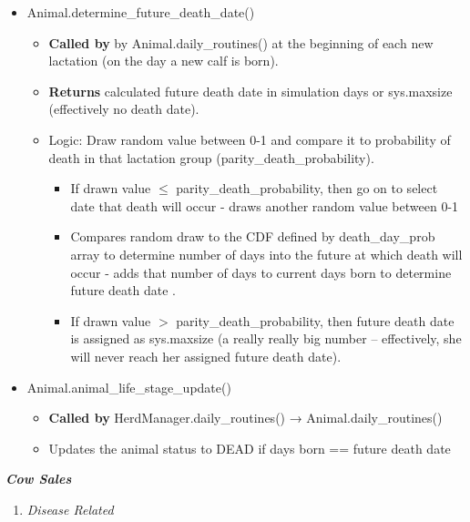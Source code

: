\begin{refsection}
        \begin{itemize}
            \item Animal.determine\_future\_death\_date()
            \begin{itemize}
                \item \textbf{Called by} by Animal.daily\_routines() at the beginning of each new lactation (on the day a new calf is born).
                \item \textbf{Returns} calculated future death date in simulation days or sys.maxsize (effectively no death date).
                \item Logic: Draw random value between 0-1 and compare it to probability of death in that lactation group (parity\_death\_probability).
                \begin{itemize}
                    \item If drawn value \(\leq \) parity\_death\_probability, then go on to select date that death will occur - draws another random value between 0-1
                    \item Compares random draw to the CDF defined by death\_day\_prob array to determine number of days into the future at which death will occur - adds that number of days to current days born to determine future death date .
                    \item If drawn value \( > \) parity\_death\_probability, then future death date is assigned as sys.maxsize (a really really big number – effectively, she will never reach her assigned future death date).
                \end{itemize}

            \end{itemize}
            \item Animal.animal\_life\_stage\_update() 
            \begin{itemize}
                \item \textbf{Called by}  HerdManager.daily\_routines() → Animal.daily\_routines()
                \item Updates the animal status to DEAD if days born == future death date
            \end{itemize}
        \end{itemize}
        \vspace{0.2cm}


\textbf{\textit{Cow Sales}}

    \begin{enumerate}
        \item \textit{Disease Related}
        \vspace{0.1cm}
        

\end{enumerate}
\end{refsection}
